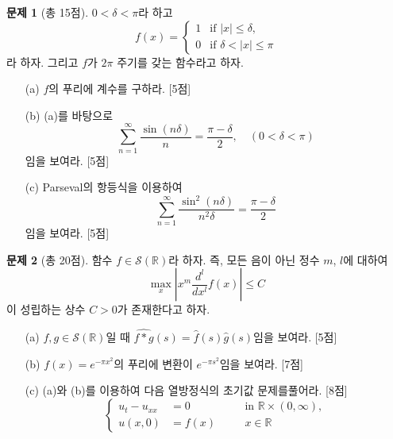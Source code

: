 \documentclass[b4paper,twocolumn]{oblivoir}
\theoremstyle{definition}
\newtheorem{problem}{문제}
\begin{document}
\begin{problem}[총 15점]
$0<\delta<\pi$라 하고 
\[
    f(x)=\begin{cases}
        1 & \text{if } |x|\leq \delta,     \\
        0 & \text{if } \delta<|x|\leq \pi
    \end{cases}
\]
라 하자. 그리고 $f$가 $2\pi$ 주기를 갖는 함수라고 하자.
\begin{enumerate}
    \item[(a)] $f$의 푸리에 계수를 구하라.  [5점]\vspace{0.3\textheight}
    \item[(b)]  (a)를 바탕으로
        \[  \sum_{n=1}^\infty \frac{ \sin (n\delta)}{n}=\frac{\pi-\delta}{2},\quad(0<\delta<\pi)  \]
        임을 보여라. [5점]\newpage 
    \item[(c)]  Parseval의 항등식을 이용하여
        \[   \sum_{n=1}^\infty \frac{\sin^2 {(n\delta)}}{n^2\delta} = \frac{\pi-\delta}{2}  \]
        임을 보여라. [5점] 
\end{enumerate}
\end{problem}

\newpage

\begin{problem}[총 20점]
함수 $f\in \mathcal{S}(\mathbb{R})$라 하자. 즉, 모든 음이 아닌 정수 $m$, $l$에 대하여  
\[ \max_x \left|x^m \frac{d^l}{dx^l} f(x)\right|\leq C \]
이 성립하는 상수 $C>0$가 존재한다고 하자.  
\begin{enumerate} 
    \item[(a)] $f,g\in \mathcal{S}(\mathbb{R})$일 때 $\widehat{f*g}(s)=\hat{f}(s)\hat{g}(s)$임을 보여라. [5점]\newpage
    \item[(b)] $f(x)=e^{-\pi x^2}$의 푸리에 변환이 $e^{-\pi s^2}$임을 보여라. [7점]\vspace{0.4\textheight}
    \item[(c)] (a)와 (b)를 이용하여 다음 열방정식의 초기값 문제를\newline  풀어라. [8점]
        \[ \left\{
            \begin{alignedat}{2}
                u_{t}-u_{xx}&=0 &&\quad \text{in } \mathbb{R}\times (0,\infty),\\
                u(x,0)&=f(x) &&\quad x\in \mathbb{R}
            \end{alignedat}
            \right. \]
\end{enumerate}
\end{problem}
\end{document}
